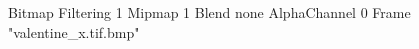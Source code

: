 {Bitmap
	{Filtering 1}
	{Mipmap 1}
	{Blend none}
	{AlphaChannel 0}
	{Frame "valentine_x.tif.bmp"}
}
